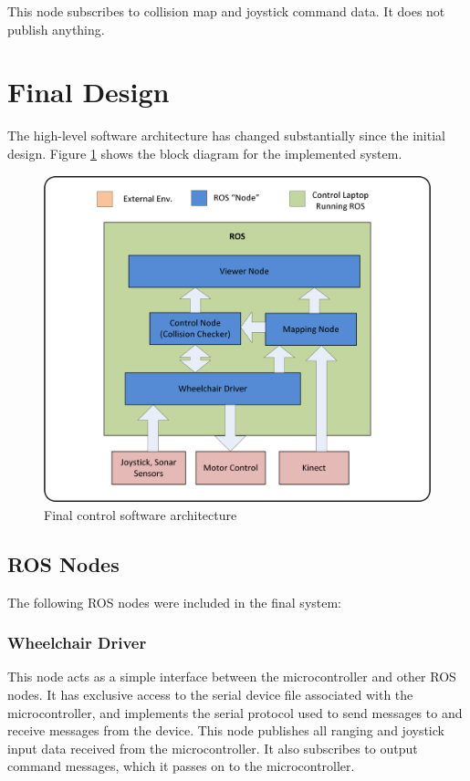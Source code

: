 \documentclass[oneside,final,a4paper]{report}
\begin{document}
This node subscribes to collision map and joystick command data.  It does not publish anything.

\section{Final Design}
The high-level software architecture has changed substantially since the initial design. Figure \ref{final_arch} shows the block diagram for the implemented system.

\begin{figure}[hbt]
 \centering
 \includegraphics[scale=0.8]{FYDP_Software_Diagram}
 \caption{Final control software architecture}
 \label{final_arch}
\end{figure}


\subsection{ROS Nodes}
The following ROS nodes were included in the final system:

\subsubsection{Wheelchair Driver} 
This node acts as a simple interface between the microcontroller and other ROS nodes.  It has exclusive access to the serial device file associated with the microcontroller, and implements the serial protocol used to send messages to and receive messages from the device.  This node publishes all ranging and joystick input data received from the microcontroller.  It also subscribes to output command messages, which it passes on to the microcontroller.
\end{document}
